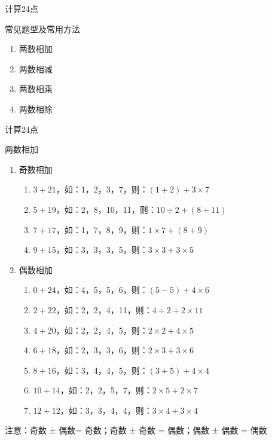 \documentclass[aspectratio=169]{ctexbeamer} %
\date{\today}
\begin{document}
\begin{frame}[t]{计算24点}
\begin{spacing}{1.2}
\normalsize
\alert{常见题型及常用方法}
\begin{enumerate}[label={\arabic*.}]
\item 两数相加
\item 两数相减
\item 两数相乘
\item 两数相除
\end{enumerate}
\end{spacing}
\end{frame}

\begin{frame}[t]{计算24点}
\begin{spacing}{1.0}
\normalsize
\alert{两数相加}
\begin{enumerate}[label={\arabic*.}]
\item 奇数相加
	\begin{enumerate}[label={\Alph*.}]
	\item $3 + 21$，如：1，2，3，7，则：$(1 + 2) + 3 \times 7$
	\item $5 + 19$，如：2，8，10，11，则：$10 \div 2 + (8 + 11)$	
	\item $7 + 17$，如：1，7，8，9，则：$1 \times 7 + (8 + 9)$
	\item $9 + 15$，如：3，3，3，5，则：$3 \times 3 + 3 \times 5$
	\end{enumerate}
\item 偶数相加
	\begin{enumerate}[label={\Alph*.}]
	\item $0 + 24$，如：4，5，5，6，则：$(5 - 5) + 4 \times 6$	
	\item $2 + 22$，如：2，2，4，11，则：$4 \div 2 + 2 \times 11$	
	\item $4 + 20$，如：2，2，4，5，则：$2 \times 2 + 4 \times 5$		
	\item $6 + 18$，如：2，3，3，6，则：$2 \times 3 + 3 \times 6$
	\item $8 + 16$，如：3，4，4，5，则：$(3 + 5) + 4 \times 4$
	\item $10 + 14$，如：2，2，5，7，则：$2 \times 5 + 2 \times 7$
	\item $12 + 12$，如：3，3，4，4，则：$3 \times 4 + 3 \times 4$
	\end{enumerate}
\end{enumerate}
\alert{注意：奇数 ± 偶数= 奇数；奇数 ± 奇数 = 偶数；偶数 ± 偶数 = 偶数}
\end{spacing}
\end{frame}
\end{document}
